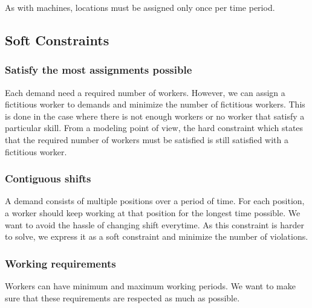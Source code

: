 \documentclass[../thesis.tex]{subfiles}
\begin{document}
As with machines, locations must be assigned only once per time period.


\subsection{Soft Constraints}

\subsubsection{Satisfy the most assignments possible}

Each demand need a required number of workers. However, we can assign a fictitious worker to demands 
and minimize the number of fictitious workers. This is done in the case where there is not enough workers
or no worker that satisfy a particular skill. From a modeling point of view, the hard constraint which states
that the required number of workers must be satisfied is still satisfied with a fictitious worker.

\subsubsection{Contiguous shifts}

A demand consists of multiple positions over a period of time. 
For each position, a worker should keep working at that position for the longest time possible. 
We want to avoid the hassle of changing shift everytime. 
As this constraint is harder to solve, we express it as a soft constraint and minimize the number of 
violations.

\subsubsection{Working requirements}

Workers can have minimum and maximum working periods. We want to make sure 
that these requirements are respected as much as possible.
\end{document}
